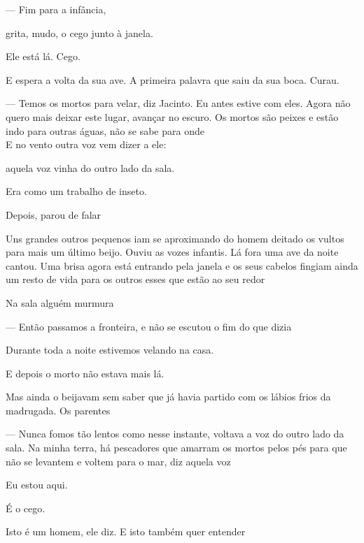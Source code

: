 \vspace*{4cm}

--- Fim para a infância,

grita, mudo, o cego junto à janela.

Ele está lá. Cego.

E espera a volta da sua ave. A primeira palavra que saiu da sua boca.
Curau.

--- Temos os mortos para velar, diz Jacinto. Eu antes estive com eles.
Agora não quero mais deixar este lugar, avançar no escuro. Os mortos são
peixes e estão indo para outras águas, não se sabe para onde\\

E no vento outra voz vem dizer a ele:

\bigskip
\bigskip
\bigskip
\bigskip

aquela voz vinha do outro lado da sala.

Era como um trabalho de inseto.

Depois, parou de falar

Uns grandes outros pequenos iam se aproximando do homem deitado os
vultos para mais um último beijo. Ouviu as vozes infantis. Lá fora uma
ave da noite cantou. Uma brisa agora está entrando pela janela e os seus
cabelos fingiam ainda um resto de vida para os outros esses que estão ao
seu redor

Na sala alguém murmura

--- Então passamos a fronteira, e não se escutou o fim do que dizia

Durante toda a noite estivemos velando na casa.

E depois o morto não estava mais lá.

Mas ainda o beijavam sem saber que já havia partido com os lábios frios
da madrugada. Os parentes

--- Nunca fomos tão lentos como nesse instante, voltava a voz do outro
lado da sala. Na minha terra, há pescadores que amarram os mortos pelos
pés para que não se levantem e voltem para o mar, diz aquela voz

\breakk

\vspace*{4cm}

Eu estou aqui.

É o cego.

Isto é um homem, ele diz. E isto também quer entender

\breakk

\vspace*{4cm}

